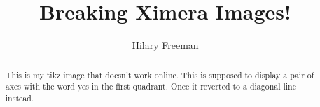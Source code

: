 \documentclass[handout]{ximera}
\title{Breaking Ximera Images!}
\author{Hilary Freeman}
\begin{document}
\begin{abstract}
  This is my tikz image that doesn't work online. This is supposed to display a pair of axes with the word yes in the first quadrant.  Once it reverted to a diagonal line instead.
\end{abstract}
\maketitle



\end{document}
